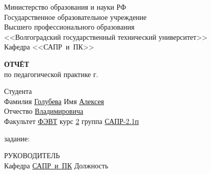 \documentclass[a4paper, 14pt]{extreport}
\begin{document}
    \begin{titlepage}
        \begin{center}
            Министерство образования и науки РФ \\
            Государственное образовательное учреждение\\
            Высшего профессионального образования\\
            <<Волгоградский государственный технический университет>>\\
            Кафедра <<САПР~и~ПК>>
        \end{center}
        \vspace{2.0cm}
        \begin{center}
            \large \textbf{ОТЧЁТ} \\
            по педагогической практике \the\year г.
        \end{center}
        \begin{flushleft}
            Студента\\
            Фамилия \underline{Голубева\hspace{3.1cm}} 
            Имя \underline{Алексея\hspace{2.1cm}}\\
            Отчество \underline{Владимировича\hspace{1.6cm}}\\
            Факультет \underline{ФЭВТ\hspace{3.45cm}} курс \underline{2\hspace{1.5cm}} 
            группа \underline{САПР-2.1п\hspace{1.9cm}}\\
        \end{flushleft}
        \vspace{1.0cm}
         задание: \underline{\hspace{22.3em}}\\
        \underline{\hspace{\textwidth}}
        \underline{\hspace{\textwidth}}
        \underline{\hspace{\textwidth}}
        \underline{\hspace{\textwidth}}
        \vspace{2.0cm}
        \begin{flushleft}
            РУКОВОДИТЕЛЬ\\
            Кафедра \underline{САПР~и~ПК\hspace{2.4cm}} Должность \underline{\hspace{5cm}} \\

\end{flushleft}
\end{titlepage}
\end{document}
